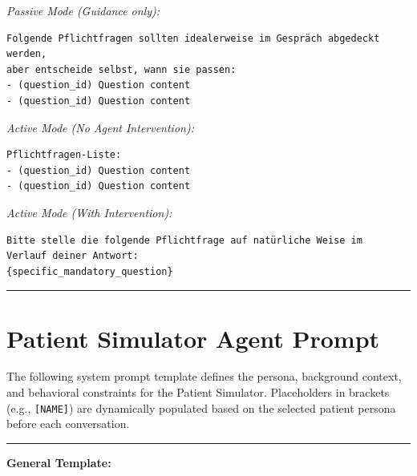 \textit{Passive Mode (Guidance only):}
\begin{Verbatim}[fontsize=\small,breaklines=true,breakanywhere=true]
Folgende Pflichtfragen sollten idealerweise im Gespräch abgedeckt werden, 
aber entscheide selbst, wann sie passen:
- (question_id) Question content
- (question_id) Question content
\end{Verbatim}

\textit{Active Mode (No Agent Intervention):}
\begin{Verbatim}[fontsize=\small,breaklines=true,breakanywhere=true]
Pflichtfragen-Liste:
- (question_id) Question content
- (question_id) Question content
\end{Verbatim}

\textit{Active Mode (With Intervention):}
\begin{Verbatim}[fontsize=\small,breaklines=true,breakanywhere=true]
Bitte stelle die folgende Pflichtfrage auf natürliche Weise im 
Verlauf deiner Antwort:
{specific_mandatory_question}
\end{Verbatim}

\vspace{0.5em}
\hrule
\vspace{0.5em}

\chapter{Patient Simulator Agent Prompt}
\label{app:patient_agent_prompt}

The following system prompt template defines the persona, background context, and behavioral constraints for the Patient Simulator. Placeholders in brackets (e.g., \texttt{[NAME]}) are dynamically populated based on the selected patient persona before each conversation.

\vspace{0.5em}
\hrule
\vspace{0.5em}

\textbf{General Template:}

